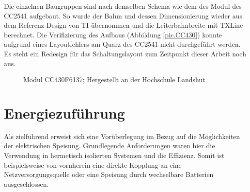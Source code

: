 \documentclass[12pt]{scrreprt} %
\begin{document}
Die einzelnen Baugruppen sind nach demselben Schema wie dem des Modul des CC2541 aufgebaut. So wurde der Balun und dessen Dimensionierung wieder aus dem Referenz-Design von TI übernommen und die Leiterbahnbreite mit TXLine berechnet. 
Die Verifizierung des Aufbaus (Abbildung \vref{pic.CC430}) konnte aufgrund eines Layoutfehlers am Quarz des CC2541 nicht durchgeführt werden. Es steht ein Redesign für das Schaltungslayout zum Zeitpunkt dieser Arbeit noch aus. 
\begin{figure}
\centering
{}
\caption{Modul CC430F6137; Hergestellt an der Hochschule Landshut}
\label{pic.CC430}
\end{figure}


\section{Energiezuführung}
Als zielführend erweist sich eine Vorüberlegung im Bezug auf die Möglichkeiten der elektrischen Speisung. Grundlegende Anforderungen waren hier die Verwendung in hermetisch isolierten Systemen und die Effizienz. Somit ist beispielsweise von vornherein eine direkte Kopplung an eine Netzversorgungsquelle oder eine Speisung durch wechselbare Batterien ausgeschlossen. 
\end{document}
